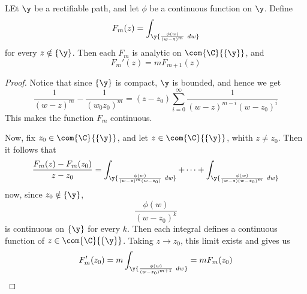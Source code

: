 \begin{lemma}\label{4.5.4}
    LEt $\y$ be a rectifiable path, and let  $\phi$ be a continuous function on
     $\y$. Define
     \begin{equation*}
         F_m(z)=\int_\y{\frac{\phi(w)}{(w-z)^m} \ dw}
     \end{equation*}
     for every $z \notin \{\y\}$. Then each $F_m$ is analytic on
     $\com{\C}{\{\y\}}$, and
     \begin{equation*}
         F_m'(z)=mF_{m+1}(z)
     \end{equation*}
\end{lemma}
\begin{proof}
    Notice that since $\{\y\}$ is compact, $\y$ is bounded, and hence we get
    \begin{equation*}
        \frac{1}{(w-z)^m}-\frac{1}{(w_0z_0)^m}=
        (z-z_0)\sum_{i=0}^{\infty}{\frac{1}{(w-z)^{m-i}(w-z_0)^i}}
    \end{equation*}
    This makes the function $F_m$ continuous.

    Now, fix $z_0 \in \com{\C}{\{\y\}}$, and let $z \in \com{\C}{\{\y\}}$, whith
    $z \neq z_0$. Then it follows that
    \begin{equation*}
        \frac{F_m(z)-F_m(z_0)}{z-z_0}=\int_\y{\frac{\phi(w)}{(w-z)^m(w-z_0)} \
        dw}+\dots+\int_\y{\frac{\phi(w)}{(w-z)(w-z_0)^m} \ dw}
    \end{equation*}
    now, since $z_0 \notin \{\y\}$,
    \begin{equation*}
        \frac{\phi(w)}{(w-z_0)^k}
    \end{equation*}
    is continuous on $\{\y\}$ for every $k$. Then each integral defines a
    continuous function of  $z \in \com{\C}{\{\y\}}$. Taking $z \xrightarrow{}
    z_0$, this limit exists and gives us
    \begin{equation*}
        F_m'(z_0)=m\int_\y{\frac{\phi(w)}{(w-z_0)^{m+1}} \ dw}=mF_m(z_0)
    \end{equation*}
\end{proof}


